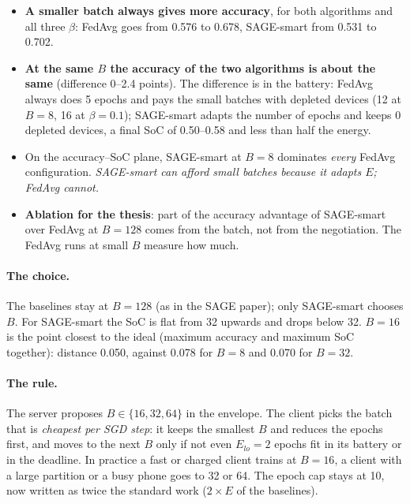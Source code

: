 \documentclass[11pt,a4paper]{article}
\begin{document}
\begin{itemize}
  \item \textbf{A smaller batch always gives more accuracy}, for both
        algorithms and all three $\beta$: FedAvg goes from 0.576 to 0.678,
        SAGE-smart from 0.531 to 0.702.
  \item \textbf{At the same $B$ the accuracy of the two algorithms is about the
        same} (difference 0--2.4 points). The difference is in the battery:
        FedAvg always does 5 epochs and pays the small batches with depleted
        devices (12 at $B=8$, 16 at $\beta=0.1$); SAGE-smart adapts the number
        of epochs and keeps 0 depleted devices, a final SoC of 0.50--0.58 and
        less than half the energy.
  \item On the accuracy--SoC plane, SAGE-smart at $B=8$ dominates
        \emph{every} FedAvg configuration. \emph{SAGE-smart can afford small
        batches because it adapts $E$; FedAvg cannot.}
  \item \textbf{Ablation for the thesis}: part of the accuracy advantage of
        SAGE-smart over FedAvg at $B=128$ comes from the batch, not from the
        negotiation. The FedAvg runs at small $B$ measure how much.
\end{itemize}

\paragraph{The choice.} The baselines stay at $B=128$ (as in the SAGE paper);
only SAGE-smart chooses $B$. For SAGE-smart the SoC is flat from 32 upwards
and drops below 32. $B=16$ is the point closest to the ideal (maximum accuracy
and maximum SoC together): distance 0.050, against 0.078 for $B=8$ and 0.070
for $B=32$.

\paragraph{The rule.} The server proposes $B\in\{16, 32, 64\}$ in the envelope.
The client picks the batch that is \emph{cheapest per SGD step}: it keeps the
smallest $B$ and reduces the epochs first, and moves to the next $B$ only if
not even $E_{lo}=2$ epochs fit in its battery or in the deadline. In practice
a fast or charged client trains at $B=16$, a client with a large partition or
a busy phone goes to 32 or 64. The epoch cap stays at 10, now written as twice
the standard work ($2\times E$ of the baselines).

\end{document}
